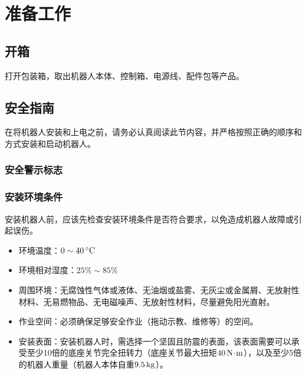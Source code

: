 \chapter{准备工作}
\section{开箱}
打开包装箱，取出机器人本体、控制箱、电源线、配件包等产品。

\section{安全指南}
\label{sec:安全指南}
在将机器人安装和上电之前，请务必认真阅读此节内容，并严格按照正确的顺序和方式安装和启动机器人。

\subsection{安全警示标志}




\subsection{安装环境条件}
安装机器人前，应该先检查安装环境条件是否符合要求，以免造成机器人故障或引起误伤。

\begin{itemize}
\item 环境温度：$0\sim 40\,\mathrm{^\circ C}$
\item 环境相对湿度：$25\%\sim 85\%$
\item 周围环境：无腐蚀性气体或液体、无油烟或盐雾、无灰尘或金属屑、无放射性材料、无易燃物品、无电磁噪声、无放射性材料，尽量避免阳光直射。
\item 作业空间：必须确保足够安全作业（拖动示教、维修等）的空间。
\item 安装表面：安装机器人时，需选择一个坚固且防震的表面，该表面需要可以承受至少10倍的底座关节完全扭转力（底座关节最大扭矩$40 \,\mathrm{N\!\cdot\! m}$），以及至少5倍的机器人重量（机器人本体自重$9.5 \,\mathrm{kg}$）。
\end{itemize}


